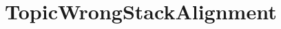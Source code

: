 \hypertarget{group___topic_wrong_stack_alignment}{}\section{Topic\+Wrong\+Stack\+Alignment}
\label{group___topic_wrong_stack_alignment}
